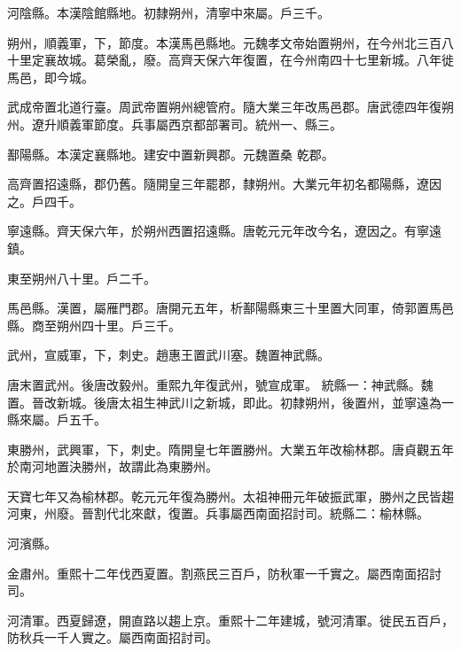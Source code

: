 \begin{pinyinscope}
 河陰縣。本漢陰館縣地。初隸朔州，清寧中來屬。戶三千。



 朔州，順義軍，下，節度。本漢馬邑縣地。元魏孝文帝始置朔州，在今州北三百八十里定襄故城。葛榮亂，廢。高齊天保六年復置，在今州南四十七里新城。八年徙馬邑，即今城。



 武成帝置北道行臺。周武帝置朔州總管府。隨大業三年改馬邑郡。唐武德四年復朔州。遼升順義軍節度。兵事屬西京都部署司。統州一、縣三。



 鄯陽縣。本漢定襄縣地。建安中置新興郡。元魏置桑
 乾郡。



 高齊置招遠縣，郡仍舊。隨開皇三年罷郡，隸朔州。大業元年初名都陽縣，遼因之。戶四千。



 寧遠縣。齊天保六年，於朔州西置招遠縣。唐乾元元年改今名，遼因之。有寧遠鎮。



 東至朔州八十里。戶二千。



 馬邑縣。漢置，屬雁門郡。唐開元五年，析鄯陽縣東三十里置大同軍，倚郭置馬邑縣。商至朔州四十里。戶三千。



 武州，宣威軍，下，刺史。趙惠王置武川塞。魏置神武縣。



 唐末置武州。後唐改毅州。重熙九年復武州，號宣成軍。
 統縣一：神武縣。魏置。晉改新城。後唐太祖生神武川之新城，即此。初隸朔州，後置州，並寧遠為一縣來屬。戶五千。



 東勝州，武興軍，下，刺史。隋開皇七年置勝州。大業五年改榆林郡。唐貞觀五年於南河地置決勝州，故謂此為東勝州。



 天寶七年又為榆林郡。乾元元年復為勝州。太祖神冊元年破振武軍，勝州之民皆趨河東，州廢。晉割代北來獻，復置。兵事屬西南面招討司。統縣二：榆林縣。



 河濱縣。



 金肅州。重熙十二年伐西夏置。割燕民三百戶，防秋軍一千實之。屬西南面招討司。



 河清軍。西夏歸遼，開直路以趨上京。重熙十二年建城，號河清軍。徙民五百戶，防秋兵一千人實之。屬西南面招討司。



\end{pinyinscope}